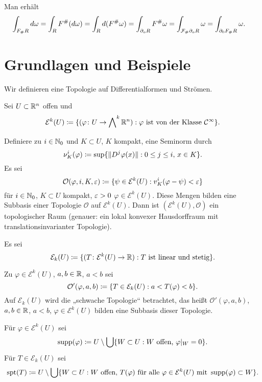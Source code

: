 \documentclass[a4paper,twoside,DIV15,BCOR12mm]{scrbook}
\newcommand{\bw}{\bigwedge\nolimits}
\DeclareMathOperator{\supp}{supp}
\DeclareMathOperator{\spt}{spt}
\begin{document}
\begin{beweis}
Man erhält
\begin{align*}
\int_{F_\# R} d\omega &= \int_R F^\#(d\omega) 
= \int_R d (F^\#\omega)
= \int_{\partial_oR} F^\# \omega 
= \int_{\mathcal{F}_\#\partial_oR} \omega 
= \int_{\partial_0 F_\#R} \omega.
\end{align*}
\end{beweis}

\section{Grundlagen und Beispiele}

Wir definieren eine Topologie auf Differentialformen und Strömen.

Sei $U\subset \mathbb{R}^n$ offen und
\[
\mathcal E^k(U)\da \{ (\varphi\colon U\to \bw^k\MdR^n) : \varphi \text{ ist von der Klasse }\mathcal C^\infty\}.
\]

Definiere zu $i\in\mathbb{N}_0$ und $K\subset U$, $K$ kompakt, eine Seminorm durch
\[
\nu^i_K(\varphi) \da \sup \{\|D^j\varphi(x)\| : 0 \le j \le i,\, x\in K\}.
\]
Es sei
\[
\mathcal O(\varphi, i, K,\ep) \da \{\psi \in \mathcal E^k(U) : v_K^i(\varphi-\psi) < \ep\}
\]
für $i\in\mathbb{N}_0$, $K\subset U$ kompakt, $\varepsilon>0$ $\varphi \in \mathcal E^k(U)$. Diese Mengen bilden eine Subbasis einer Topologie $\mathcal O$ auf $\mathcal E^k(U)$. Dann ist $(\mathcal E^k(U),\mathcal O)$ ein topologischer Raum (genauer: ein lokal konvexer Hausdorffraum mit translationsinvarianter Topologie).

\begin{definition}
Es sei
\[
\mathcal E_k(U) \da \{( T\colon \mathcal E^k(U) \to \MdR) : T\text{ ist linear und stetig}\}.
\]
\end{definition}

Zu $\varphi \in \mathcal E^k(U)$, $a,b\in \mathbb{R}$, $a<b$ sei
\[
\mathcal O'(\varphi,a,b) \da \{ T\in \mathcal E_k(U) : a < T(\varphi) < b\}.
\]
Auf $\mathcal E_k(U)$ wird die „schwache Topologie“ betrachtet, das heißt $\mathcal O'(\varphi,a,b)$, $a,b\in \mathbb{R}$, $a<b$, $\varphi \in \mathcal E^k(U)$ bilden eine Subbasis dieser Topologie.

\begin{definition}[Träger]
Für $\varphi \in \mathcal E^k(U)$ sei
\[
\supp(\varphi) \da U \setminus \bigcup \{ W\subset U: \text{$W$ offen, } \varphi|_W = 0\}.
\]
Für $T\in \mathcal E_k(U)$ sei
\[
\spt(T) \da U \setminus \bigcup \{ W\subset U: \text{$W$ offen, } T(\varphi) \text{ für alle }\varphi \in \mathcal E^k(U) \text{ mit } \supp(\varphi)\subset W\}.
\]
\end{definition}
\end{document}
